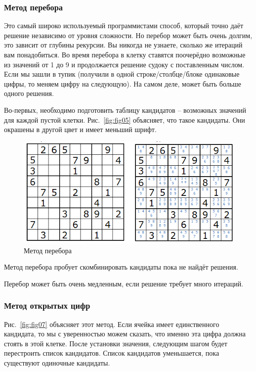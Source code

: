 \subsubsection*{Метод перебора}
Это самый широко используемый программистами способ, который точно даёт решение независимо от уровня сложности. Но перебор может быть очень долгим, это зависит от глубины рекурсии. Вы никогда не узнаете, сколько же итераций вам понадобиться. Во время перебора в клетку ставятся поочерёдно возможные из значений от 1 до 9 и продолжается решение судоку с поставленным числом. Если мы зашли в тупик (получили в одной строке/столбце/блоке одинаковые цифры, то меняем цифру на следующую). На самом деле, может быть больше одного решения.

Во-первых, необходимо подготовить таблицу кандидатов – возможных значений для каждой пустой клетки. Рис.~\ref{fig:fig05}  объясняет, что такое кандидаты. Они окрашены в другой цвет и имеет меньший шрифт. 

\begin{figure}[ht!]
 \centering 
 \includegraphics[width=\textwidth]{inc/raster/analysis1-6.png} 
 \caption{Метод перебора} 
 \label{fig:fig06} 
\end{figure}

Метод перебора пробует скомбинировать кандидаты пока не найдёт решения. 

Перебор может быть очень медленным, если решение требует много итераций. 

\subsubsection*{Метод открытых цифр}
Рис.~\ref{fig:fig07}  объясняет этот метод. Если ячейка имеет единственного кандидата, то мы с уверенностью можем сказать, что именно эта цифра должна стоять в этой клетке. После установки значения, следующим шагом будет перестроить список кандидатов. Список кандидатов уменьшается, пока существуют одиночные кандидаты.

